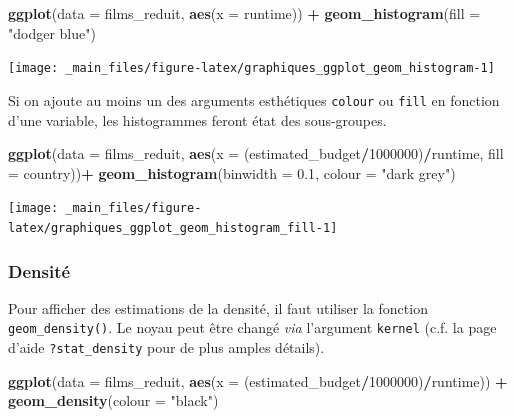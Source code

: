 \documentclass[
  11pt,
]{book}
\newenvironment{Shaded}{\begin{snugshade}}{\end{snugshade}}
\newcommand{\DataTypeTok}[1]{\textcolor[rgb]{0.13,0.29,0.53}{#1}}
\newcommand{\DecValTok}[1]{\textcolor[rgb]{0.00,0.00,0.81}{#1}}
\newcommand{\FloatTok}[1]{\textcolor[rgb]{0.00,0.00,0.81}{#1}}
\newcommand{\KeywordTok}[1]{\textcolor[rgb]{0.13,0.29,0.53}{\textbf{#1}}}
\newcommand{\NormalTok}[1]{#1}
\newcommand{\OperatorTok}[1]{\textcolor[rgb]{0.81,0.36,0.00}{\textbf{#1}}}
\newcommand{\StringTok}[1]{\textcolor[rgb]{0.31,0.60,0.02}{#1}}
\numberwithin{equation}{section}
\numberwithin{countremarque}{section}
\begin{document}
\begin{Shaded}
\begin{Highlighting}[]
\KeywordTok{ggplot}\NormalTok{(}\DataTypeTok{data =}\NormalTok{ films\_reduit,}
       \KeywordTok{aes}\NormalTok{(}\DataTypeTok{x =}\NormalTok{ runtime)) }\OperatorTok{+}
\StringTok{  }\KeywordTok{geom\_histogram}\NormalTok{(}\DataTypeTok{fill =} \StringTok{"dodger blue"}\NormalTok{)}
\end{Highlighting}
\end{Shaded}

\begin{center}\texttt{[image: \_main\_files/figure-latex/graphiques\_ggplot\_geom\_histogram-1]} \end{center}

Si on ajoute au moins un des arguments esthétiques \texttt{colour} ou \texttt{fill} en fonction d'une variable, les histogrammes feront état des sous-groupes.

\begin{Shaded}
\begin{Highlighting}[]
\KeywordTok{ggplot}\NormalTok{(}\DataTypeTok{data =}\NormalTok{ films\_reduit,}
       \KeywordTok{aes}\NormalTok{(}\DataTypeTok{x =}\NormalTok{ (estimated\_budget}\OperatorTok{/}\DecValTok{1000000}\NormalTok{)}\OperatorTok{/}\NormalTok{runtime,}
           \DataTypeTok{fill =}\NormalTok{ country))}\OperatorTok{+}
\StringTok{  }\KeywordTok{geom\_histogram}\NormalTok{(}\DataTypeTok{binwidth =} \FloatTok{0.1}\NormalTok{, }\DataTypeTok{colour =} \StringTok{"dark grey"}\NormalTok{)}
\end{Highlighting}
\end{Shaded}

\begin{center}\texttt{[image: \_main\_files/figure-latex/graphiques\_ggplot\_geom\_histogram\_fill-1]} \end{center}

\hypertarget{graphiques_qplot_geom_densite}{%
\subsubsection{Densité}\label{graphiques_qplot_geom_densite}}

Pour afficher des estimations de la densité, il faut utiliser la fonction \texttt{geom\_density()}. Le noyau peut être changé \emph{via} l'argument \texttt{kernel} (c.f. la page d'aide \texttt{?stat\_density} pour de plus amples détails).

\begin{Shaded}
\begin{Highlighting}[]
\KeywordTok{ggplot}\NormalTok{(}\DataTypeTok{data =}\NormalTok{ films\_reduit,}
       \KeywordTok{aes}\NormalTok{(}\DataTypeTok{x =}\NormalTok{ (estimated\_budget}\OperatorTok{/}\DecValTok{1000000}\NormalTok{)}\OperatorTok{/}\NormalTok{runtime)) }\OperatorTok{+}
\StringTok{  }\KeywordTok{geom\_density}\NormalTok{(}\DataTypeTok{colour =} \StringTok{"black"}\NormalTok{)}
\end{Highlighting}
\end{Shaded}
\end{document}

